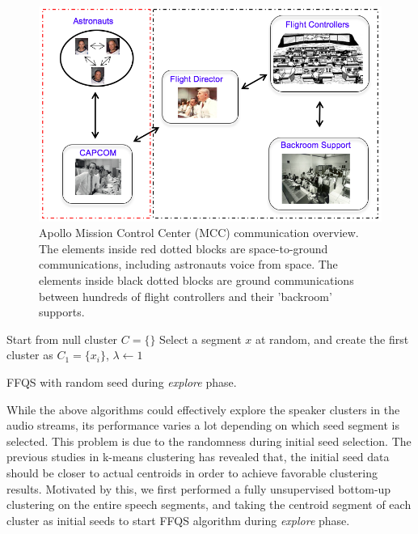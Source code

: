 \documentclass[journal]{IEEEtran}
\begin{document}
\begin{figure}[t]
	\includegraphics[width=\linewidth]{figs/comm5}
	\caption{Apollo Mission Control Center (MCC) communication overview. The elements inside red dotted blocks are space-to-ground communications, including astronauts voice from space. The elements inside black dotted blocks are ground communications between hundreds of flight controllers and their 'backroom' supports. }
	\label{fig:comm}
\end{figure} 
\begin{algorithm}
	Start from null cluster $C= \{\}$\;
	Select a segment $x$ at random, and create the first cluster as $C_1 = \{x_i\}$, $\lambda \leftarrow 1$\; 
	\caption{FFQS with random seed during \textit{explore} phase.}
	\label{a1}
\end{algorithm}
 
While the above algorithms could effectively explore the speaker clusters in the audio streams, its performance varies a lot depending on which seed segment is selected. This problem is due to the randomness during initial seed selection. The previous studies in k-means clustering has revealed that, the initial seed data should be closer to actual centroids in order to achieve favorable clustering results. Motivated by this, we first performed a fully unsupervised bottom-up clustering on the entire speech segments, and taking the centroid segment of each cluster as initial seeds to start FFQS algorithm during \textit{explore} phase.
\end{document}
